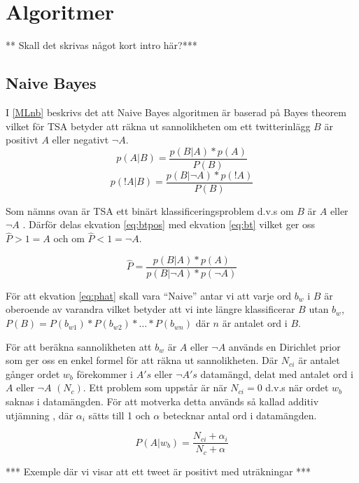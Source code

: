 \documentclass{kaumasters} %
\begin{document}
\section{Algoritmer}
** Skall det skrivas något kort intro här?***
\subsection{Naive Bayes}
I \ref{MLnb} beskrivs det att Naive Bayes algoritmen är baserad på Bayes theorem  \cite{wiki:009} vilket för TSA betyder att räkna ut sannolikheten om ett twitterinlägg $B$ är positivt $A$ eller negativt $\neg A$. 
\begin{equation}\label{eq:btpos}
p(A|B) = \frac{p(B|A) * p(A)}{P(B)}
\end{equation}
\begin{equation}\label{eq:bt}
p(!A|B) = \frac{p(B|\neg A) * p(!A)}{P(B)}
\end{equation}

Som nämns ovan är TSA ett binärt klassificeringsproblem d.v.s om  $B$ är $A$ eller $\neg A$ . Därför delas ekvation \ref{eq:btpos} med ekvation \ref{eq:bt} vilket ger oss $\hat{P} > 1 = A$ och om $\hat{P} < 1 = \neg A$.  

\begin{equation}\label{eq:phat}
\hat{P} = \frac{p(B|A) * p(A)}{p(B|\neg A) * p(\neg A)}
\end{equation}

För att ekvation \ref{eq:phat} skall vara “Naive” antar vi att varje ord $b_w$ i $B$ är oberoende av varandra vilket betyder att vi inte längre klassificerar $B$ utan $b_w$, $P(B) = P(b_{w1}) * P(b_{w2}) * … * P(b_{wn})$ där $n$ är antalet ord i $B$.

För att beräkna sannolikheten att $b_w$ är $A$ eller $\neg A$ används en Dirichlet prior \cite{wiki:012}\cite{nb:007} som ger oss en enkel formel för att räkna ut sannolikheten. Där $N_{ci}$ är antalet gånger ordet $w_b$ förekommer i $A's$ eller $\neg A's$ datamängd, delat med antalet ord i $A$ eller $\neg A$ $(N_c)$. Ett problem som uppstår är när $N_{ci} = 0$ d.v.s när ordet $w_b$ saknas i datamängden. För att motverka detta används så kallad additiv utjämning \cite{wiki:013}, där $\alpha_i$ sätts till 1 och $\alpha$ betecknar antal ord i datamängden. 

\begin{equation}
P(A | w_b)= \frac{N_{ci} + \alpha_i}{N_c + \alpha}
\end{equation}

*** Exemple där vi visar att ett tweet är positivt med uträkningar ***
\end{document}

